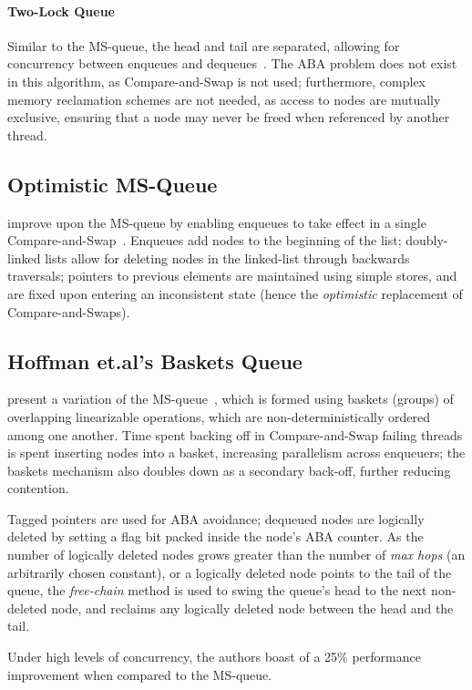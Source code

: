 \paragraph{Two-Lock Queue}
Similar to the MS-queue, the head and tail are separated, allowing for
concurrency between enqueues and dequeues~\citep{michael1996simple}. The ABA
problem does not exist in this algorithm, as Compare-and-Swap is not used;
furthermore, complex memory reclamation schemes are not needed, as access to
nodes are mutually exclusive, ensuring that a node may never be freed when
referenced by another thread.

\subsection{Optimistic MS-Queue}
\citeauthor{ladan2008optimistic} improve upon the MS-queue by enabling enqueues
to take effect in a single Compare-and-Swap~\citep{ladan2008optimistic}.
Enqueues add nodes to the beginning of the list;
doubly-linked lists allow for deleting nodes in the linked-list through backwards
traversals;
pointers to previous elements are maintained using simple stores, and are fixed
upon entering an inconsistent state (hence the \emph{optimistic} replacement of
Compare-and-Swaps).

\subsection{Hoffman et.al's Baskets Queue}
\citeauthor{hoffman2007baskets} present a variation of the MS-queue~\citep{hoffman2007baskets}, which is formed
using baskets (groups) of overlapping linearizable operations, which are non-deterministically
ordered among one another.
Time spent backing off in Compare-and-Swap failing threads is
spent inserting nodes into a basket, increasing parallelism across enqueuers;
the baskets mechanism also doubles down as a secondary back-off, further reducing contention.

Tagged pointers are used for ABA avoidance; dequeued nodes are logically
deleted by setting a flag bit packed inside the node's ABA counter. 
As the number of logically deleted nodes grows greater than the number of
\emph{max hops} (an arbitrarily chosen constant), or a logically deleted node
points to the tail of the queue, the \emph{free-chain} method is used to swing
the queue's head to the next non-deleted node, and reclaims any logically
deleted node between the head and the tail.

Under high levels of concurrency, the authors boast of a 25\% performance
improvement when compared to the MS-queue.

